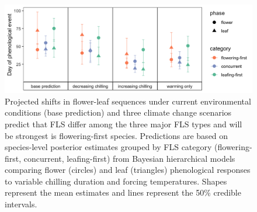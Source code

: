 \documentclass[11pt]{article}\usepackage[]{graphicx}\usepackage[]{color}
\begin{document}
\pagebreak

\begin{figure}[h!]
    \centering
 \includegraphics[width=\textwidth]{..//Plots/Flobuds_manuscript_figs/posteriorgroups_go.png} 
    \caption{Projected shifts in flower-leaf sequences under current environmental conditions (base prediction) and three climate change scenarios predict that FLS differ among the three major FLS types and will be strongest is flowering-first species. Predictions are based on species-level posterior estimates grouped by FLS category (flowering-first, concurrent, leafing-first) from Bayesian hierarchical models comparing flower (circles) and leaf (triangles) phenological responses to variable chilling duration and forcing temperatures. Shapes represent the mean estimates and lines represent the 50\% credible intervals. }
    \label{fig:preddy}
\end{figure}
\end{document}
